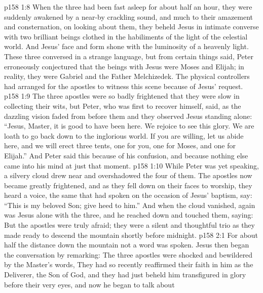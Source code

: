 \vs p158 1:8 When the three had been fast asleep for about half an hour, they were suddenly awakened by a near\hyp{}by crackling sound, and much to their amazement and consternation, on looking about them, they beheld Jesus in intimate converse with two brilliant beings clothed in the habiliments of the light of the celestial world. And Jesus’ face and form shone with the luminosity of a heavenly light. These three conversed in a strange language, but from certain things said, Peter erroneously conjectured that the beings with Jesus were Moses and Elijah; in reality, they were Gabriel and the Father Melchizedek. The physical controllers had arranged for the apostles to witness this scene because of Jesus’ request.
\vs p158 1:9 The three apostles were so badly frightened that they were slow in collecting their wits, but Peter, who was first to recover himself, said, as the dazzling vision faded from before them and they observed Jesus standing alone: “Jesus, Master, it is good to have been here. We rejoice to see this glory. We are loath to go back down to the inglorious world. If you are willing, let us abide here, and we will erect three tents, one for you, one for Moses, and one for Elijah.” And Peter said this because of his confusion, and because nothing else came into his mind at just that moment.
\vs p158 1:10 While Peter was yet speaking, a silvery cloud drew near and overshadowed the four of them. The apostles now became greatly frightened, and as they fell down on their faces to worship, they heard a voice, the same that had spoken on the occasion of Jesus’ baptism, say: “This is my beloved Son; give heed to him.” And when the cloud vanished, again was Jesus alone with the three, and he reached down and touched them, saying:  But the apostles were truly afraid; they were a silent and thoughtful trio as they made ready to descend the mountain shortly before midnight.
\vs p158 2:1 For about half the distance down the mountain not a word was spoken. Jesus then began the conversation by remarking:  The three apostles were shocked and bewildered by the Master’s words,  They had so recently reaffirmed their faith in him as the Deliverer, the Son of God, and they had just beheld him transfigured in glory before their very eyes, and now he began to talk about 
